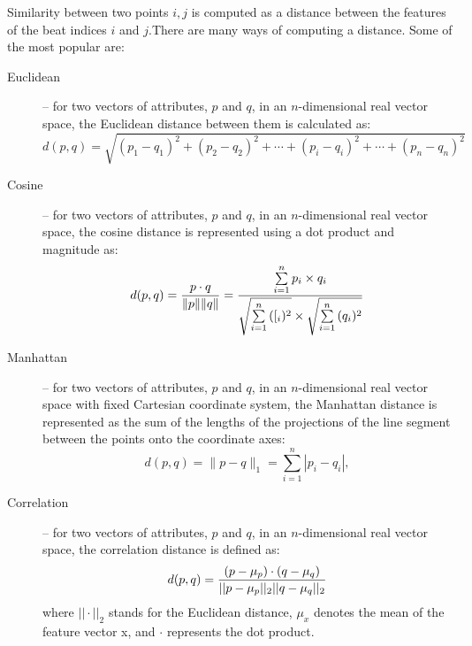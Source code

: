 Similarity between two points $i, j$ is computed as a distance between the features of the beat indices $i$ and $j$.There are many ways of computing a distance. Some of the most popular are:
\begin{description}
\item[Euclidean] --  for two vectors of attributes, $p$ and $q$, in an $n$-dimensional real vector space, the Euclidean distance between them is calculated as:
\begin{equation}
d(p, q) = \sqrt{(p_1- q_1)^2 + (p_2 - q_2)^2+\cdots+(p_i - q_i)^2+\cdots+(p_n - q_n)^2}
\end{equation}
\item[Cosine] --  for two vectors of attributes, $p$ and $q$, in an $n$-dimensional real vector space, the cosine distance is represented using a dot product and magnitude as:
\begin{equation}
d(p, q) = {p \cdot q \over \|p\| \|q\|} = \frac{ \sum\limits_{i=1}^{n}{p_i \times q_i} }{ \sqrt{\sum\limits_{i=1}^{n}{([_i)^2}} \times \sqrt{\sum\limits_{i=1}^{n}{(q_i)^2}} }
\end{equation}
\item[Manhattan] --  for two vectors of attributes, $p$ and $q$, in an $n$-dimensional real vector space with fixed Cartesian coordinate system, the Manhattan distance is represented as the sum of the lengths of the projections of the line segment between the points onto the coordinate axes:
\begin{equation}
d(p, q) = \|p - q\|_1 = \sum_{i=1}^n |p_i-q_i|,
\end{equation}
\item[Correlation] --  for two vectors of attributes, $p$ and $q$, in an $n$-dimensional real vector space, the correlation distance is defined as:
\begin{equation}
d(p, q) =  {(p - \mu _{p}) \cdot (q - \mu _{q}) \over ||p -\mu _{p} ||_{2} ||q - \mu _{q}||_{2}}
\end{equation}
where $|| \cdot ||_{2}$ stands for the Euclidean distance, $\mu _{x}$ denotes the mean of the feature vector x, and $\cdot$ represents the dot product.
\end{description}

\vspace{10pt}

